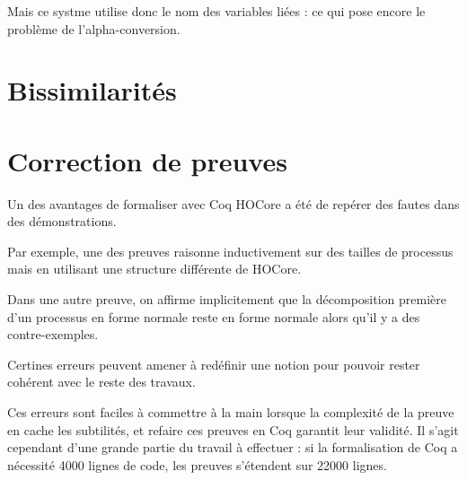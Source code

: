 \documentclass[11pt]{article}
\begin{document}
Mais ce systme utilise donc le nom des variables liées : ce qui pose encore le problème de l'alpha-conversion.


\section{Bissimilarités}


\section{Correction de preuves}
Un des avantages de formaliser avec Coq HOCore a été de repérer des fautes dans des démonstrations.

Par exemple, une des preuves raisonne inductivement sur des tailles de processus mais en utilisant une structure différente de HOCore.

Dans une autre preuve, on affirme implicitement que la décomposition première d'un processus en forme normale reste en forme normale alors qu'il y a des contre-exemples.

Certines erreurs peuvent amener à redéfinir une notion pour pouvoir rester cohérent avec le reste des travaux.

Ces erreurs sont faciles à commettre à la main lorsque la complexité de la preuve en cache les subtilités, et refaire ces preuves en Coq garantit leur validité. Il s'agit cependant d'une grande partie du travail à effectuer : si la formalisation de Coq a nécessité 4000 lignes de code, les preuves s'étendent sur 22000 lignes. 




\end{document}
